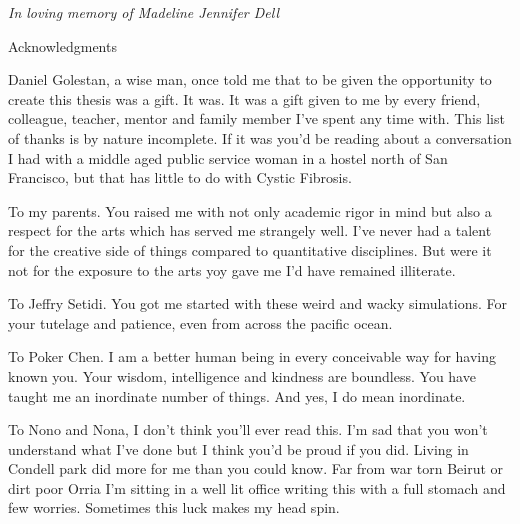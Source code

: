 \newpage


\thispagestyle{empty}


\begin{center}
	\vspace*{\fill}
\textit {In loving memory of Madeline Jennifer Dell} \\
	\vspace*{\fill}
\end{center}

\clearpage

\begin{center}
\begin{Large}
\begin{bfseries}
Acknowledgments
\end{bfseries}
\end{Large}
\end{center}
 Daniel Golestan, a wise man, once told me that to be given the opportunity to create this thesis was a gift. It was. It was a gift given to me by every friend, colleague, teacher, mentor and family member I've spent any time with. This list of thanks is by nature incomplete. If it was you'd be reading about a conversation I had with a middle aged public service woman in a hostel north of San Francisco, but that has little to do with Cystic Fibrosis. 

To my parents. You raised me with not only academic rigor in mind but also a respect for the arts which has served me strangely well. I've never had a talent for the creative side of things compared to quantitative disciplines. But were it not for the exposure to the arts yoy gave me I'd have remained illiterate. 

To Jeffry Setidi. You got me started with these weird and wacky simulations. For your tutelage and patience, even from across the pacific ocean.

To Poker Chen. I am a better human being in every conceivable way for having known you. Your wisdom, intelligence and kindness are boundless. You have taught me an inordinate number of things. And yes, I do mean inordinate. 

To Nono and Nona, I don't think you'll ever read this. I'm sad that you won't understand what I've done but I think you'd be proud if you did. Living in Condell park did more for me than you could know. Far from war torn Beirut or dirt poor Orria I'm sitting in a well lit office writing this with a full stomach and few worries. Sometimes this luck makes my head spin. 

